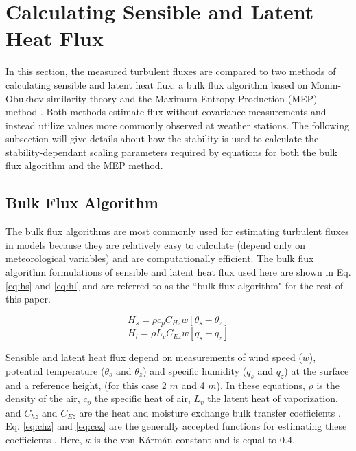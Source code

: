 \section{Calculating Sensible and Latent Heat Flux}
In this section, the measured turbulent fluxes are compared to two methods of calculating sensible and latent heat flux: a bulk flux algorithm based on Monin-Obukhov similarity theory \citep{foken:2008} and the Maximum Entropy Production (MEP) method \citep{zhang:2021, wang:2014, wang:2009}. Both methods estimate flux without covariance measurements and instead utilize values more commonly observed at weather stations. The following subsection will give details about how the stability is used to calculate the stability-dependant scaling parameters required by equations for both the bulk flux algorithm and the MEP method.  

\subsection{Bulk Flux Algorithm}
The bulk flux algorithms are most commonly used for estimating turbulent fluxes \cite{reeves:2021} in models because they are relatively easy to calculate (depend only on meteorological variables) and are computationally efficient. The bulk flux algorithm formulations of sensible and latent heat flux used here are shown in Eq. \ref{eq:hs} and \ref{eq:hl} and are referred to as the ``bulk flux algorithm" for the rest of this paper.

\begin{equation}\label{eq:hs}
H_{s} = \rho c_{p} C_{Hz} w [\theta_{s} - \theta_{z}]
\end{equation}
\begin{equation}\label{eq:hl}
H_{l} = \rho L_{v} C_{Ez} w [q_{s} - q_{z}] 
\end{equation}

Sensible and latent heat flux depend on measurements of wind speed ($w$), potential temperature ($\theta_{s}$ and $\theta_{z}$) and specific humidity ($q_{s}$ and $q_{z}$) at the surface and a reference height, (for this case 2 $m$ and 4 $m$). In these equations, $\rho$ is the density of the air, $c_{p}$ the specific heat of air, $L_{v}$ the latent heat of vaporization, and $C_{hz}$ and $C_{Ez}$ are the heat and moisture exchange bulk transfer coefficients \citep{foken:2008, andreas:311}. Eq. \ref{eq:chz} and \ref{eq:cez} are the generally accepted functions for estimating these coefficients \citep{foken:2008}. Here, $\kappa$ is the von K\'{a}rm\'{a}n constant and is equal to $0.4$.

